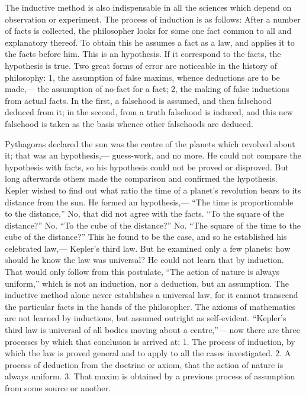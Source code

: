\documentclass[12pt]{article}
\begin{document}
The inductive method is also indispensable in all the sciences which depend on observation or experiment. The process of induction is as follows: After a number of facts is collected, the philosopher looks for some one fact common to all and explanatory thereof. To obtain this he assumes a fact as a law, and applies it to the facts before him. This is an hypothesis. If it correspond to the facts, the hypothesis is true. Two great forms of error are noticeable in the history of philosophy: 1, the assumption of false maxims, whence deductions are to be made,--- the assumption of no-fact for a fact; 2, the making of false inductions from actual facts. In the first, a falsehood is assumed, and then falsehood deduced from it; in the second, from a truth falsehood is induced, and this new falsehood is taken as the basis whence other falsehoods are deduced. 

Pythagoras declared the sun was the centre of the planets which revolved about it; that was an hypothesis,--- guess-work, and no more. He could not compare the hypothesis with facts, so his hypothesis could not be proved or disproved. But long afterwards others made the comparison and confirmed the hypothesis. Kepler wished to find out what ratio the time of a planet's revolution bears to its distance from the sun. He formed an hypothesis,--- ``The time is proportionable to the distance,'' No, that did not agree with the facts. ``To the square of the distance?'' No. ``To the cube of the distance?'' No. ``The square of the time to the cube of the distance?'' This he found to be the case, and so he established his celebrated law,--- Kepler's third law. But he examined only a few planets: how should he know the law was universal? He could not learn that by induction. That would only follow from this postulate, ``The action of nature is always uniform,'' which is not an induction, nor a deduction, but an assumption. The inductive method alone never establishes a universal law, for it cannot transcend the particular facts in the hands of the philosopher. The axioms of mathematics are not learned by inductions, but assumed outright as self-evident. ``Kepler's third law is universal of all bodies moving about a centre,''--- now there are three processes by which that conclusion is arrived at: 1. The process of induction, by which the law is proved general and to apply to all the cases investigated. 2. A process of deduction from the doctrine or axiom, that the action of nature is always uniform. 3. That maxim is obtained by a previous process of assumption from some source or another. 
\end{document}
